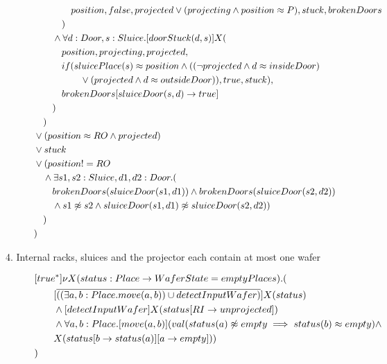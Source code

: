 \begin{description}
\begin{align*}
& \tab\tab\tab\tab position, false, projected \vee (projecting \wedge position \approx P),  stuck, brokenDoors \\
& \tab\tab\tab ) \\
&  \tab\tab  \wedge \forall d:Door,s:Sluice.[doorStuck(d, s)]X( \\
&  \tab\tab    \tab position,   projecting,  projected, \\
&  \tab\tab   \tab                        if(sluicePlace(s) \approx position \wedge ((\neg projected \wedge d \approx insideDoor) \\
& \tab\tab\tab\tab\tab \vee (projected \wedge d \approx outsideDoor)), true, stuck), \\
&  \tab\tab                       \tab brokenDoors[sluiceDoor(s,d)\to true] \\
&  \tab\tab                                              ) \\
&  \tab ) \\
&  \vee (position \approx RO \wedge projected) \\
& \vee stuck \\
& \vee (position != RO \\ 
& \tab \wedge \exists s1,s2:Sluice,d1,d2:Door.( \\
& \tab \tab brokenDoors(sluiceDoor(s1, d1)) \wedge brokenDoors(sluiceDoor(s2, d2)) \\
&\tab\tab \wedge s1 \not \approx s2 \wedge sluiceDoor(s1, d1) \not \approx sluiceDoor(s2, d2)) \\
&\tab ) \\
&)
	\end{align*}

 
 \item[4. Internal racks, sluices and the projector each contain at most one wafer]
    
\begin{align*}
		&[true^*] \nu X(status:Place \to WaferState=emptyPlaces).(\\
  & \tab\tab [\overline{((\exists a,b:Place.move(a,b)) \cup detectInputWafer)}]X(status)\\
  & \tab\tab  \wedge [detectInputWafer]X(status[RI \to unprojected])\\
  & \tab\tab  \wedge \forall a,b:Place.[move(a, b)](val(status(a) \not \approx empty \implies status(b)  \approx empty) \wedge \\ & \tab \tab X(status[b \to status(a)][a \to empty]))\\
&)
	\end{align*}


\end{description}

